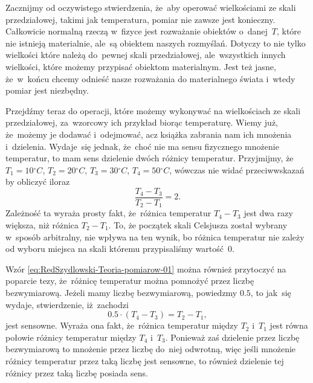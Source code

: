 \documentclass[a4paper,11pt]{article}
\begin{document}
Zacznijmy od oczywistego stwierdzenia, że~aby operować wielkościami ze skali
przedziałowej, takimi jak temperatura, pomiar nie zawsze jest konieczny.
Całkowicie normalną rzeczą w~fizyce jest rozważanie obiektów o~danej~$T$,
które nie istnieją materialnie, ale~są obiektem naszych rozmyślań. Dotyczy
to nie tylko wielkości które należą do~pewnej skali przedziałowej,
ale~wszystkich innych wielkości, które możemy przypisać obiektom materialnym.
Jest też jasne, że~w~końcu chcemy odnieść nasze rozważania do materialnego
świata i~wtedy pomiar jest niezbędny.

Przejdźmy teraz do operacji, które możemy wykonywać na wielkościach ze skali
przedziałowej, za~wzorcowy ich przykład biorąc temperaturę. Wiemy już,
że~możemy je dodawać i~odejmować, acz książka zabrania nam ich mnożenia
i~dzielenia. Wydaje~się jednak, że~choć nie ma sensu fizycznego mnożenie
temperatur, to mam sens dzielenie dwóch różnicy temperatur. Przyjmijmy,
że~$T_{ 1 } = 10 {}^{ \circ }\si{C}$, $T_{ 2 } = 20 {}^{ \circ }\si{C}$,
$T_{ 3 } = 30 {}^{ \circ }\si{C}$, $T_{ 4 } = 50 {}^{ \circ }\si{C}$, wówczas nie widać
przeciwwskazań by obliczyć iloraz
\begin{equation}
  \label{eq:RedSzydlowski-Teoria-pomiarow-01}
  \frac{ T_{ 4 } - T_{ 3 } }{ T_{ 2 } - T_{ 1 } } = 2.
\end{equation}
Zależność ta wyraża prosty fakt, że~różnica temperatur $T_{ 4 } - T_{ 3 }$
jest dwa razy większa, niż różnica $T_{ 2 } - T_{ 1 }$. To, że początek skali
Celsjusza został wybrany w~sposób arbitralny, nie wpływa na ten wynik, bo
różnica temperatur nie zależy od wyboru miejsca na skali któremu
przypisaliśmy wartość~$0$.

Wzór \eqref{eq:RedSzydlowski-Teoria-pomiarow-01} można również przytoczyć na
poparcie tezy, że~różnicę temperatur można pomnożyć przez liczbę
bezwymiarową. Jeżeli mamy liczbę bezwymiarową, powiedzmy $0.5$, to
jak~się wydaje, stwierdzenie, iż~zachodzi
\begin{equation}
  \label{eq:RedSzydlowski-Teoria-pomiarow-02}
  0.5 \cdot ( T_{ 4 } - T_{ 3 } ) = T_{ 2 } - T_{ 1 },
\end{equation}
jest sensowne. Wyraża ona fakt, że~różnica temperatur między $T_{ 2 }$
i~$T_{ 1 }$ jest równa połowie różnicy temperatur między $T_{ 4 }$ i~$T_{ 3 }$.
Ponieważ zaś dzielenie przez liczbę bezwymiarową to mnożenie przez liczbę
do~niej odwrotną, więc jeśli mnożenie różnicy temperatur przez taką liczbę
jest sensowne, to również dzielenie tej różnicy przez taką liczbę posiada
sens.
\end{document}
